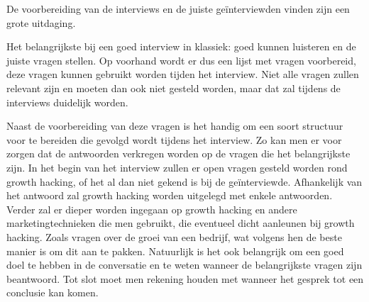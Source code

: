 De voorbereiding van de interviews en de juiste geïnterviewden vinden zijn een grote uitdaging. 

Het belangrijkste bij een goed interview in klassiek: goed kunnen luisteren en de juiste vragen stellen. Op voorhand wordt er dus een lijst met vragen voorbereid, deze vragen kunnen gebruikt worden tijden het interview. Niet alle vragen zullen relevant zijn en moeten dan ook niet gesteld worden, maar dat zal tijdens de interviews duidelijk worden.

Naast de voorbereiding van deze vragen is het handig om een soort structuur voor te bereiden die gevolgd wordt tijdens het interview. Zo kan men er voor zorgen dat de antwoorden verkregen worden op de vragen die het belangrijkste zijn. In het begin van het interview zullen er open vragen gesteld worden rond growth hacking, of het al dan niet gekend is bij de geïnterviewde. Afhankelijk van het antwoord zal growth hacking worden uitgelegd met enkele antwoorden. Verder zal er dieper worden ingegaan op growth hacking en andere marketingtechnieken die men gebruikt, die eventueel dicht aanleunen bij growth hacking. Zoals vragen over de groei van een bedrijf, wat volgens hen de beste manier is om dit aan te pakken. Natuurlijk is het ook belangrijk om een goed doel te hebben in de conversatie en te weten wanneer de belangrijkste vragen zijn beantwoord. Tot slot moet men rekening houden met wanneer het gesprek tot een conclusie kan komen.


